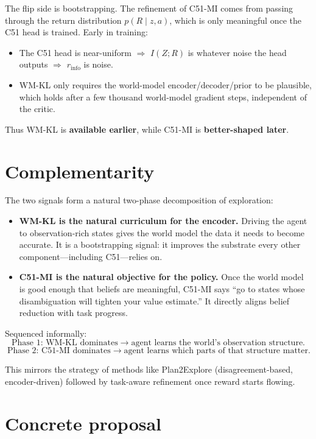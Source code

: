 \documentclass[11pt]{article}
\begin{document}
The flip side is bootstrapping. The refinement of C51-MI comes from passing
through the return distribution $p(R\mid z, a)$, which is only meaningful
once the C51 head is trained. Early in training:
\begin{itemize}
  \item The C51 head is near-uniform $\Rightarrow$ $I(Z;R)$ is whatever
    noise the head outputs $\Rightarrow$ $r_{\mathrm{info}}$ is noise.
  \item WM-KL only requires the world-model encoder/decoder/prior to be
    plausible, which holds after a few thousand world-model gradient steps,
    independent of the critic.
\end{itemize}
Thus WM-KL is \textbf{available earlier}, while C51-MI is \textbf{better-shaped later}.

\section{Complementarity}

The two signals form a natural two-phase decomposition of exploration:

\begin{itemize}
  \item \textbf{WM-KL is the natural curriculum for the encoder.} Driving
    the agent to observation-rich states gives the world model the data
    it needs to become accurate. It is a bootstrapping signal: it improves
    the substrate every other component---including C51---relies on.
  \item \textbf{C51-MI is the natural objective for the policy.} Once the
    world model is good enough that beliefs are meaningful, C51-MI says
    ``go to states whose disambiguation will tighten your value estimate.''
    It directly aligns belief reduction with task progress.
\end{itemize}

Sequenced informally:
\[
  \text{Phase 1: WM-KL dominates} \;\longrightarrow\; \text{agent learns the world's observation structure.}
\]
\[
  \text{Phase 2: C51-MI dominates} \;\longrightarrow\; \text{agent learns which parts of that structure matter.}
\]

This mirrors the strategy of methods like Plan2Explore (disagreement-based,
encoder-driven) followed by task-aware refinement once reward starts flowing.

\section{Concrete proposal}
\end{document}
